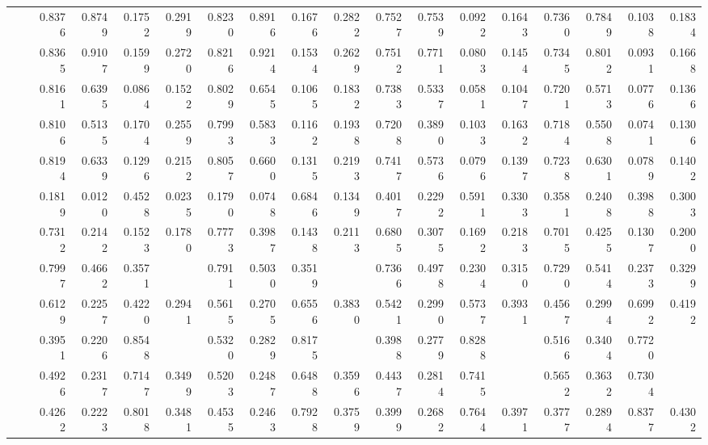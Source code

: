 \begin{table*}[t]
{\begin{tabular}{|l|l|r|r|r|r|r|r|r|r|r|r|r|r|r|r|r|r|}
			\multirow{11}{*}{\rotatebox{90}{\DBLP}} 
			&\ATC       & 0.8376 & 0.8749 & 0.1752 & 0.2919 & 0.8230 & 0.8916 & 0.1676 & 0.2822 & 0.7527 & 0.7539 & 0.0922 & 0.1643 & 0.7360 & 0.7849 & 0.1038 & 0.1834 \\
			&\CTC       & 0.8365 & 0.9107 & 0.1599 & 0.2720 & 0.8216 & 0.9214 & 0.1534 & 0.2629 & 0.7512 & 0.7711 & 0.0803 & 0.1454 & 0.7345 & 0.8012 & 0.0931 & 0.1668 \\\cline{2-18}
			&\MAML      & 0.8161 & 0.6395 & 0.0864 & 0.1522 & 0.8029 & 0.6545 & 0.1065 & 0.1832 & 0.7383 & 0.5337 & 0.0581 & 0.1047 & 0.7201 & 0.5713 & 0.0776 & 0.1366 \\
			&\Reptile   & 0.8106 & 0.5135 & 0.1704 & 0.2559 & 0.7993 & 0.5833 & 0.1162 & 0.1938 & 0.7208 & 0.3890 & 0.1033 & 0.1632 & 0.7184 & 0.5508 & 0.0741 & 0.1306 \\
			&\Featrans  & 0.8194 & 0.6339 & 0.1296 & 0.2152 & 0.8057 & 0.6600 & 0.1315 & 0.2193 & 0.7417 & 0.5736 & 0.0796 & 0.1397 & 0.7238 & 0.6301 & 0.0789 & 0.1402 \\
			&\PN        & 0.1819 & 0.0120 & 0.4528 & 0.0235 & 0.1790 & 0.0748 & 0.6846 & 0.1349 & 0.4017 & 0.2292 & 0.5911 & 0.3303 & 0.3581 & 0.2408 & 0.3988 & 0.3003 \\\cline{2-18}
			&\Supervise & 0.7312 & 0.2142 & 0.1523 & 0.1780 & 0.7773 & 0.3987 & 0.1438 & 0.2113 & 0.6805 & 0.3075 & 0.1692 & 0.2183 & 0.7015 & 0.4255 & 0.1307 & 0.2000 \\
			&\ICSGNN    & 0.7997 & 0.4662 & 0.3571 & \cellcolor{LightRed}{0.4044} & 0.7911 & 0.5030 & 0.3519 & \cellcolor{LightCyan}{0.4141} & 0.7366 & 0.4978 & 0.2304 & 0.3150 & 0.7290 & 0.5414 & 0.2373 & 0.3299 \\
			&\AQDGNN    & 0.6129 & 0.2257 & 0.4220 & 0.2941 & 0.5615 & 0.2705 & 0.6556 & 0.3830 & 0.5421 & 0.2990 & 0.5737 & 0.3931 & 0.4567 & 0.2994 & 0.6992 & 0.4192 \\\cline{2-18}
			&\CGNPIP    & 0.3951 & 0.2206 & 0.8548 & \cellcolor{LightCyan}{0.3507} & 0.5320 & 0.2829 & 0.8175 & \cellcolor{LightRed}{0.4203} & 0.3988 & 0.2779 & 0.8288 & \cellcolor{LightRed}{0.4162} & 0.5166 & 0.3404 & 0.7720 & \cellcolor{LightCyan}{0.4725} \\
			&\CGNPMLP   & 0.4926 & 0.2317 & 0.7147 & 0.3499 & 0.5203 & 0.2487 & 0.6488 & 0.3596 & 0.4437 & 0.2814 & 0.7415 & \cellcolor{LightCyan}{0.4080} & 0.5652 & 0.3632 & 0.7304 & \cellcolor{LightRed}{0.4851} \\
			&\CGNPGNN   & 0.4262 & 0.2223 & 0.8018 & 0.3481 & 0.4535 & 0.2463 & 0.7928 & 0.3759 & 0.3999 & 0.2682 & 0.7644 & 0.3971  & 0.3777 & 0.2894 & 0.8377 & 0.4302
			\\\hline
		\end{tabular}
	}
\end{table*}




